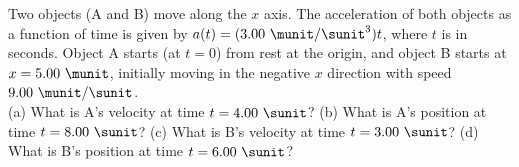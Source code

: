 
Two objects (A and B) move along the $x$ axis. The acceleration of
both objects as a function of time is given by $a(t) =
(3.00\ \munit/\sunit^3)t$, where $t$ is in seconds. Object A
starts (at $t=0$) from rest at the origin, and object B starts at $x
= 5.00\ \munit$, initially moving in the negative $x$ direction with speed
$9.00\ \munit/\sunit$.\\
(a) What is A's velocity at time $t = 4.00\ \sunit$?\answercheck\hwendpart
%
(b) What is A's position at time $t = 8.00\ \sunit$?\answercheck\hwendpart
%
(c) What is B's velocity at time $t = 3.00\ \sunit$?\answercheck\hwendpart
%
(d) What is B's position at time $t = 6.00\ \sunit$?\answercheck

